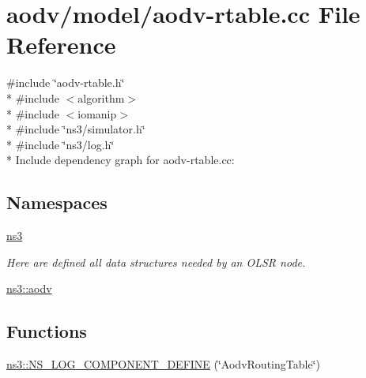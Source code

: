 \hypertarget{aodv-rtable_8cc}{}\section{aodv/model/aodv-\/rtable.cc File Reference}
\label{aodv-rtable_8cc}
{\ttfamily \#include \char`\"{}aodv-\/rtable.\+h\char`\"{}}\\*
{\ttfamily \#include $<$algorithm$>$}\\*
{\ttfamily \#include $<$iomanip$>$}\\*
{\ttfamily \#include \char`\"{}ns3/simulator.\+h\char`\"{}}\\*
{\ttfamily \#include \char`\"{}ns3/log.\+h\char`\"{}}\\*
Include dependency graph for aodv-\/rtable.cc\+:
\subsection*{Namespaces}
\begin{DoxyCompactItemize}
\item 
 \hyperlink{namespacens3}{ns3}
\begin{DoxyCompactList}\small\item\em Here are defined all data structures needed by an O\+L\+SR node. \end{DoxyCompactList}\item 
 \hyperlink{namespacens3_1_1aodv}{ns3\+::aodv}
\end{DoxyCompactItemize}
\subsection*{Functions}
\begin{DoxyCompactItemize}
\item 
\hyperlink{namespacens3_ae505cc1a8ed48c6b0e0867398f501d5e}{ns3\+::\+N\+S\+\_\+\+L\+O\+G\+\_\+\+C\+O\+M\+P\+O\+N\+E\+N\+T\+\_\+\+D\+E\+F\+I\+NE} (\char`\"{}Aodv\+Routing\+Table\char`\"{})
\end{DoxyCompactItemize}
